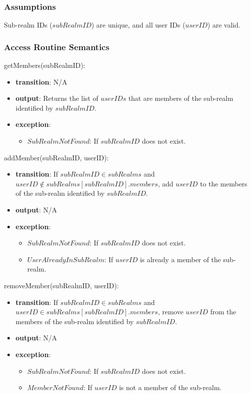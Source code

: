 \documentclass[12pt, titlepage]{article}
\begin{document}
\subsubsection{Assumptions}

Sub-realm IDs (\( subRealmID \)) are unique, and all user IDs (\( userID \)) are valid.

\subsubsection{Access Routine Semantics}

\noindent getMembers(subRealmID):
\begin{itemize}
  \item \textbf{transition}: N/A
  \item \textbf{output}: Returns the list of \( userIDs \) that are members of the sub-realm identified by \( subRealmID \).
  \item \textbf{exception}:
        \begin{itemize}
          \item \( SubRealmNotFound \): If \( subRealmID \) does not exist.
        \end{itemize}
\end{itemize}

\noindent addMember(subRealmID, userID):
\begin{itemize}
  \item \textbf{transition}:
        If \( subRealmID \in subRealms \) and \( userID \notin subRealms[subRealmID].members \), add \( userID \) to the members of the sub-realm identified by \( subRealmID \).
  \item \textbf{output}: N/A
  \item \textbf{exception}:
        \begin{itemize}
          \item \( SubRealmNotFound \): If \( subRealmID \) does not exist.
          \item \( UserAlreadyInSubRealm \): If \( userID \) is already a member of the sub-realm.
        \end{itemize}
\end{itemize}

\noindent removeMember(subRealmID, userID):
\begin{itemize}
  \item \textbf{transition}:
        If \( subRealmID \in subRealms \) and \( userID \in subRealms[subRealmID].members \), remove \( userID \) from the members of the sub-realm identified by \( subRealmID \).
  \item \textbf{output}: N/A
  \item \textbf{exception}:
        \begin{itemize}
          \item \( SubRealmNotFound \): If \( subRealmID \) does not exist.
          \item \( MemberNotFound \): If \( userID \) is not a member of the sub-realm.
        \end{itemize}
\end{itemize}
\end{document}

